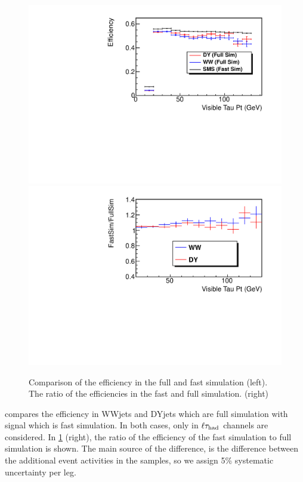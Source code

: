 \begin{figure}[!Hhtb]
\centering
\includegraphics[angle=0,scale=0.35]{SystematicsFigs/TauEff_lepTau.pdf}
\includegraphics[angle=0,scale=0.35]{SystematicsFigs/TauEff_lepTau_ratio.pdf}
\caption{Comparison of the \Tau efficiency in the full and fast simulation (left). The ratio of the efficiencies in the fast and full simulation. (right)}
\label{fig:TauEffFastFull}
\end{figure}
compares the \Tau efficiency in WWjets and DYjets which are full simulation with signal which is fast simulation. In 
both cases, only \Tau in $\ell\tau_{\rm had}$ channels are considered. In 
\ref{fig:TauEffFastFull} (right), the ratio of the efficiency of the fast simulation to full simulation is shown. 
The main source of the difference, is the difference between the additional event activities in the samples, so we assign 5\% systematic uncertainty per \Tau leg.

